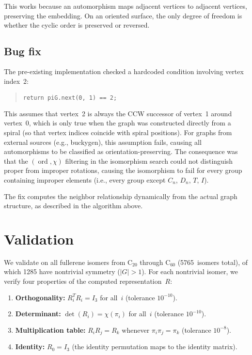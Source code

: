 \documentclass[11pt]{article}
\DeclareMathOperator{\ord}{ord}
\DeclareMathOperator{\det}{det}
\begin{document}
This works because an automorphism maps adjacent vertices to adjacent
vertices, preserving the embedding.  On an oriented surface, the only
degree of freedom is whether the cyclic order is preserved or reversed.

\subsection{Bug fix}

The pre-existing implementation checked a hardcoded condition involving
vertex index~2:
\begin{quote}
  \texttt{return piG.next(0, 1) == 2;}
\end{quote}
This assumes that vertex~2 is always the CCW successor of vertex~1
around vertex~0, which is only true when the graph was constructed
directly from a spiral (so that vertex indices coincide with spiral
positions).  For graphs from external sources (e.g., buckygen), this
assumption fails, causing all automorphisms to be classified as
orientation-preserving.  The consequence was that the $(\ord, \chi)$
filtering in the isomorphism search could not distinguish proper from
improper rotations, causing the isomorphism to fail for every group
containing improper elements (i.e., every group except $C_n$, $D_n$,
$T$, $I$).

The fix computes the neighbor relationship dynamically from the actual
graph structure, as described in the algorithm above.

\section{Validation}
\label{sec:validation}

We validate on all fullerene isomers from C$_{20}$ through C$_{60}$
(5765~isomers total), of which 1285 have nontrivial symmetry ($|G| >
1$).  For each nontrivial isomer, we verify four properties of the
computed representation~$R$:

\begin{enumerate}
  \item \textbf{Orthogonality:} $R_i^T R_i = I_3$ for all~$i$
    (tolerance $10^{-10}$).
  \item \textbf{Determinant:} $\det(R_i) = \chi(\pi_i)$ for all~$i$
    (tolerance $10^{-10}$).
  \item \textbf{Multiplication table:} $R_i R_j = R_k$ whenever
    $\pi_i \pi_j = \pi_k$ (tolerance $10^{-8}$).
  \item \textbf{Identity:} $R_0 = I_3$ (the identity permutation maps
    to the identity matrix).
\end{enumerate}
\end{document}
